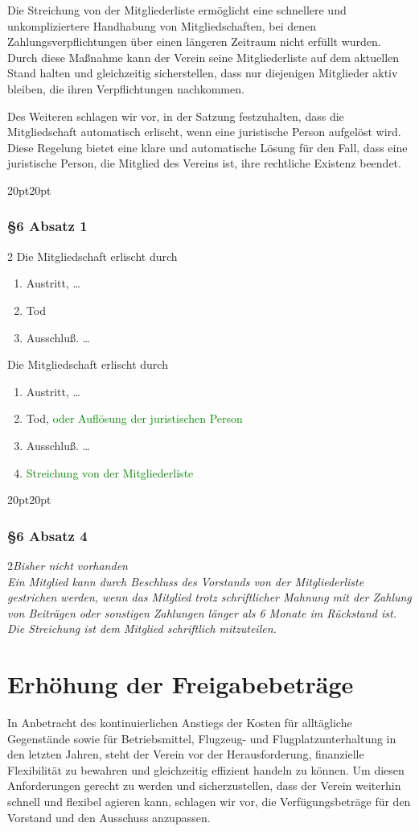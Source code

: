 \documentclass[10pt,a4paper,parskip=half]{scrartcl}
\newcommand{\new}[1]{\textcolor{Green}{#1}}
\newcommand{\change}[1]{
  \begin{adjustwidth}{20pt}{20pt}
    #1
  \end{adjustwidth}
}
\newcommand{\compare}[3]{\change{\subsubsection*{#1}\begin{multicols}{2}#2\columnbreak\\#3\end{multicols}}}
\begin{document}
  Die Streichung von der Mitgliederliste ermöglicht eine schnellere und unkompliziertere Handhabung von Mitgliedschaften, bei denen Zahlungsverpflichtungen über einen längeren Zeitraum nicht erfüllt wurden. Durch diese Maßnahme kann der Verein seine Mitgliederliste auf dem aktuellen Stand halten und gleichzeitig sicherstellen, dass nur diejenigen Mitglieder aktiv bleiben, die ihren Verpflichtungen nachkommen.

  Des Weiteren schlagen wir vor, in der Satzung festzuhalten, dass die Mitgliedschaft automatisch erlischt, wenn eine juristische Person aufgelöst wird. Diese Regelung bietet eine klare und automatische Lösung für den Fall, dass eine juristische Person, die Mitglied des Vereins ist, ihre rechtliche Existenz beendet.

  \change{
  \subsubsection*{§6 Absatz 1}
  \begin{multicols}{2}
  Die Mitgliedschaft erlischt durch
  \begin{enumerate}[label=\alph*)]
    \item Austritt, \dots
    \item Tod
    \item{Ausschluß.} \dots
  \end{enumerate}
  \columnbreak
  Die Mitgliedschaft erlischt durch
  \begin{enumerate}[label=\alph*)]
    \item Austritt, \dots
    \item Tod, \new{oder Auflösung der juristischen Person}
    \item{Ausschluß.} \dots
    \item \new{Streichung von der Mitgliederliste}
  \end{enumerate}
\end{multicols}
  }
\compare{§6 Absatz 4}{\em Bisher nicht vorhanden \em}{Ein Mitglied kann durch Beschluss des Vorstands von der Mitgliederliste gestrichen werden,
wenn das Mitglied trotz schriftlicher Mahnung mit der Zahlung von Beiträgen oder sonstigen Zahlungen länger als 6 Monate im Rückstand ist.
Die Streichung ist dem Mitglied schriftlich mitzuteilen.}


  \section{Erhöhung der Freigabebeträge}
  In Anbetracht des kontinuierlichen Anstiegs der Kosten für alltägliche Gegenstände sowie für Betriebsmittel, Flugzeug- und Flugplatzunterhaltung in den letzten Jahren, steht der Verein vor der Herausforderung, finanzielle Flexibilität zu bewahren und gleichzeitig effizient handeln zu können. Um diesen Anforderungen gerecht zu werden und sicherzustellen, dass der Verein weiterhin schnell und flexibel agieren kann, schlagen wir vor, die Verfügungsbeträge für den Vorstand und den Ausschuss anzupassen.
\end{document}
